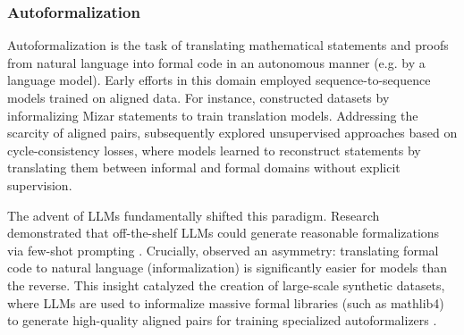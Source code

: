 \documentclass[11pt]{article}
\numberwithin{equation}{section}
\begin{document}
\subsubsection{Autoformalization}

Autoformalization is the task of translating mathematical statements and proofs from natural language into formal code in an autonomous manner (e.g. by a language model). Early efforts in this domain employed sequence-to-sequence models trained on aligned data. For instance, \cite{wang2018first} constructed datasets by informalizing Mizar statements to train translation models. Addressing the scarcity of aligned pairs, \cite{wang2020exploration} subsequently explored unsupervised approaches based on cycle-consistency losses, where models learned to reconstruct statements by translating them between informal and formal domains without explicit supervision.

The advent of LLMs fundamentally shifted this paradigm. Research demonstrated that off-the-shelf LLMs could generate reasonable formalizations via few-shot prompting \cite{wu2022autoformalization,gadgil2022towards,agrawal2022towards,azerbayev2023proofnet}. Crucially, \cite{wu2022autoformalization} observed an asymmetry: translating formal code to natural language (informalization) is significantly easier for models than the reverse. This insight catalyzed the creation of large-scale synthetic datasets, where LLMs are used to informalize massive formal libraries (such as mathlib4) to generate high-quality aligned pairs for training specialized autoformalizers \cite{jiang2023multilingual,lu2024process,gao2025herald,liu2025rethinking}.
\end{document}
